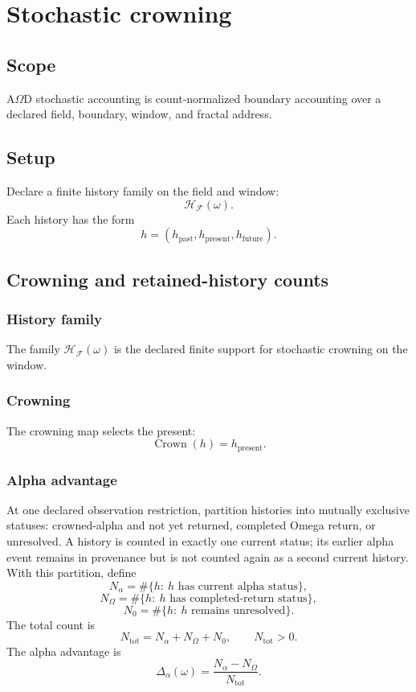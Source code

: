 \section{Stochastic crowning}
\label{app:stochastic-crowning}

\subsection{Scope}
\label{app:stoch-scope}
A\(\Omega\)D stochastic accounting is count-normalized boundary accounting over a declared field, boundary, window, and fractal address.


\subsection{Setup}
\label{app:stoch-setup}
Declare a finite history family on the field and window:
\[
\mathcal H_{\mathcal F}(\omega).
\]
Each history has the form
\[
h=(h_{\mathrm{past}},h_{\mathrm{present}},h_{\mathrm{future}}).
\]

\subsection{Crowning and retained-history counts}
\label{app:stoch-statements}

\subsubsection{History family}
\label{app:stoch-history-family}
The family \(\mathcal H_{\mathcal F}(\omega)\) is the declared finite support for stochastic crowning on the window.

\subsubsection{Crowning}
\label{app:stoch-crowning}
The crowning map selects the present:
\[
\operatorname{Crown}(h)=h_{\mathrm{present}}.
\]

\subsubsection{Alpha advantage}
\label{app:stoch-alpha-advantage}
At one declared observation restriction, partition histories into mutually
exclusive statuses: crowned-alpha and not yet returned, completed Omega
return, or unresolved. A history is counted in exactly one current status;
its earlier alpha event remains in provenance but is not counted again as a
second current history. With this partition, define
\[
N_\alpha=
\#\{h:\ h\text{ has current alpha status}\},
\]
\[
N_\Omega=
\#\{h:\ h\text{ has completed-return status}\},
\]
\[
N_0=
\#\{h:\ h\text{ remains unresolved}\}.
\]
The total count is
\[
N_{\mathrm{tot}}=N_\alpha+N_\Omega+N_0,
\qquad
N_{\mathrm{tot}}>0.
\]
The alpha advantage is
\begin{equation}
\Delta_\alpha(\omega)=
\frac{N_\alpha-N_\Omega}{N_{\mathrm{tot}}}.
\label{app:stochastic:eq:alpha-advantage}
\end{equation}

